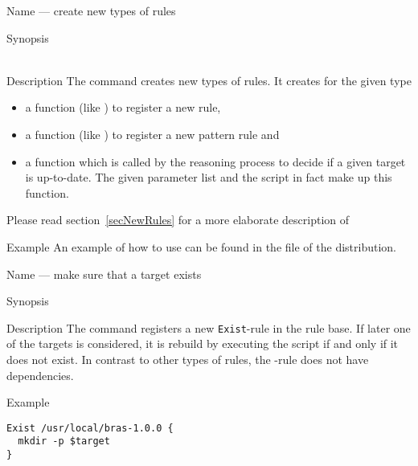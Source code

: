\documentclass[12pt]{article}
\begin{document}
\begin{Describe}
\item[Name]  --- create new types of rules
\item[Synopsis]    \\ 
     \\
\item[Description] The command creates new types of rules. It
  creates for the given type 
  \begin{itemize}
  \item a function (like ) to register a new rule, 
  \item a function (like ) to register a new
    pattern rule and
  \item a function which is called by the reasoning process to
    decide if a given target is up-to-date. The given parameter list
    and the script in fact make up this function.
  \end{itemize}
  Please read section~\ref{secNewRules} for a more elaborate
  description of 
\item[Example] An example of how to use  can be found
  in the file  of the distribution.
\end{Describe}

\begin{Describe}
\item[Name]  --- make sure that a target exists
\item[Synopsis]   
\item[Description] The command registers a new \texttt{Exist}-rule in
  the rule base. If later one of the targets is considered, it is
  rebuild by executing the script if and only if it does not exist. In
  contrast to other types of rules, the -rule does not have
  dependencies.
\item[Example]
\begin{verbatim}
Exist /usr/local/bras-1.0.0 {
  mkdir -p $target
}
\end{verbatim}
\end{Describe}
\end{document}
